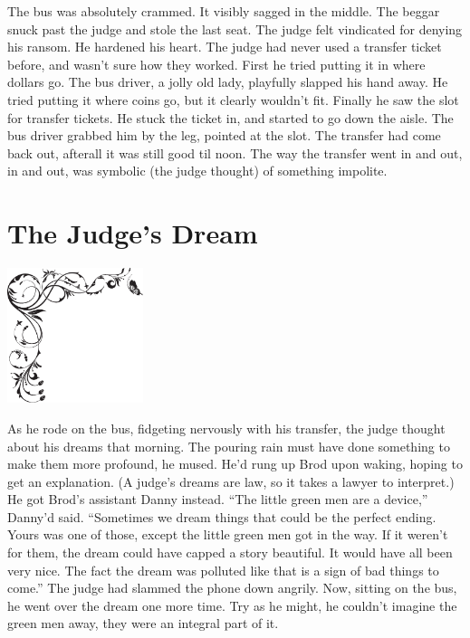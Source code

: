 \documentclass[oneside]{book}
\begin{document}
The bus was absolutely crammed.  It visibly sagged in the middle.
The beggar snuck past the judge and stole the last
seat.  The judge felt vindicated for denying his ransom.  He hardened his heart.
The judge had never used a transfer ticket before, and wasn't sure how they worked.
First he tried putting it in where dollars go.  The bus driver, a jolly old lady,
playfully slapped his hand away.  He tried putting it where coins go, but it clearly wouldn't
fit.  Finally he saw the slot for transfer tickets.  He stuck the ticket in, and started to
go down the aisle.  The bus driver grabbed him by the leg, pointed at the slot.  The transfer
had come back out, afterall it was still good til noon.  The way the transfer went in and out,
in and out, was symbolic (the judge thought) of something impolite.

\chapter{The Judge's Dream}

\vspace{-2.25in}
\hspace{-.75in}
\includegraphics[width=150px]{ulcornerjudgedream.eps}

As he rode on the bus, fidgeting nervously with his transfer,
the judge thought about his dreams that morning.
The pouring rain must have done something to make them more profound, he
mused.  He'd rung up Brod upon waking, hoping to get an explanation.
(A judge's dreams are law, so it takes a lawyer to interpret.)
He got Brod's assistant Danny instead.  ``The little green men are a device,''
Danny'd said.  ``Sometimes we dream things that could be the perfect ending.
Yours was one of those, except the little green men got in the way.
If it weren't for them, the dream could have capped a story beautiful.  It would
have all been very nice.  The fact the dream was polluted like that is
a sign of bad things to come.''  The judge had slammed the phone down angrily.
Now, sitting on the bus, he went over the dream one more time.
Try as he might, he couldn't imagine the green men away, they were an
integral part of it.
\end{document}
